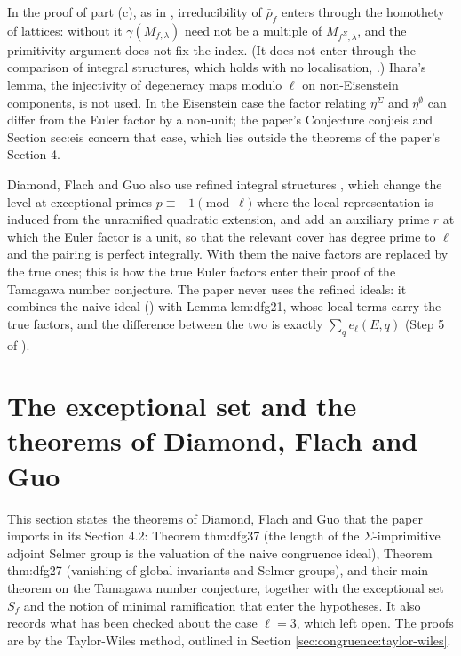 \begin{remark}\label{rem:congruence:ihara}
In the proof of part (c), as in \cite{DFG04}, irreducibility of $\bar\rho_f$ enters through the homothety of lattices: without it $\gamma(M_{f,\lambda})$ need not be a multiple of
$M_{f^\Sigma,\lambda}$, and the primitivity argument does not fix the index. (It does not enter through the comparison of integral structures, which holds with no localisation,
.) Ihara's lemma, the injectivity of degeneracy maps modulo $\ell$ on non-Eisenstein components, is not used. In the Eisenstein case the factor relating $\eta^\Sigma$ and $\eta^\emptyset$ can differ from the Euler factor by a non-unit; the paper's Conjecture conj:eis and
Section sec:eis concern that case, which lies outside the theorems of the paper's Section 4.
\end{remark}

\begin{remark}\label{rem:congruence:refined-structures}
Diamond, Flach and Guo also use refined integral structures \cite[Section 1.8]{DFG04}, which change the level at exceptional primes $p\equiv-1\pmod\ell$ where the local
representation is induced from the unramified quadratic extension, and add an auxiliary prime $r$ at which the Euler factor is a unit, so that the relevant cover has degree
prime to $\ell$ and the pairing is perfect integrally. With them the naive factors are replaced by the true ones; this is how the true Euler factors enter their proof of
the Tamagawa number conjecture. The paper never uses the refined ideals: it combines the naive ideal () with Lemma lem:dfg21, whose local terms carry the
true factors, and the difference between the two is exactly $\sum_qe_\ell(E,q)$ (Step 5 of ).
\end{remark}

\section[The exceptional set and the theorems of DFG]{The exceptional set and the theorems of Diamond, Flach and Guo}\label{sec:congruence:dfg-theorems}

This section states the theorems of Diamond, Flach and Guo that the paper imports in its Section 4.2: Theorem thm:dfg37 (the length of the $\Sigma$-imprimitive
adjoint Selmer group is the valuation of the naive congruence ideal), Theorem thm:dfg27 (vanishing of global invariants and Selmer groups), and their main theorem on the
Tamagawa number conjecture, together with the exceptional set $S_f$ and the notion of minimal ramification that enter the hypotheses. It also records what has been checked
about the case $\ell=3$, which  left open. The proofs are by the Taylor-Wiles method, outlined in Section \ref{sec:congruence:taylor-wiles}.

